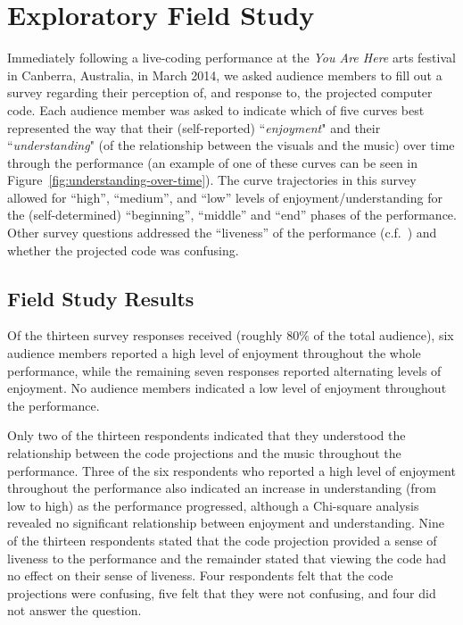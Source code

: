 \documentclass{sig-alternate}
\begin{document}
\section{Exploratory Field Study}

Immediately following a live-coding performance at the \emph{You Are
Here} arts festival in Canberra, Australia, in March 2014, we asked
audience members to fill out a survey regarding their perception of,
and response to, the projected computer code. Each audience member was
asked to indicate which of five curves best represented the way that
their (self-reported) ``\emph{enjoyment}" and their
``\emph{understanding}" (of the relationship between the visuals and
the music) over time through the performance (an example of one of
these curves can be seen in Figure~\ref{fig:understanding-over-time}).
The curve trajectories in this survey allowed for ``high'',
``medium'', and ``low'' levels of enjoyment/understanding for the
(self-determined) ``beginning'', ``middle'' and ``end'' phases of the
performance. Other survey questions addressed the ``liveness'' of the
performance (c.f.~\cite{Auslander}) and whether the projected code was
confusing.

\subsection{Field Study Results}

Of the thirteen survey responses received (roughly $80\%$ of the total
audience), six audience members reported a high level of enjoyment
throughout the whole performance, while the remaining seven responses
reported alternating levels of enjoyment. No audience members
indicated a low level of enjoyment throughout the performance.

Only two of the thirteen respondents indicated that they understood
the relationship between the code projections and the music throughout
the performance. Three of the six respondents who reported a high
level of enjoyment throughout the performance also indicated an
increase in understanding (from low to high) as the performance
progressed, although a Chi-square analysis revealed no significant
relationship between enjoyment and understanding. Nine of the thirteen
respondents stated that the code projection provided a sense of
liveness to the performance and the remainder stated that viewing the
code had no effect on their sense of liveness. Four respondents felt
that the code projections were confusing, five felt that they were not
confusing, and four did not answer the question.
\end{document}
